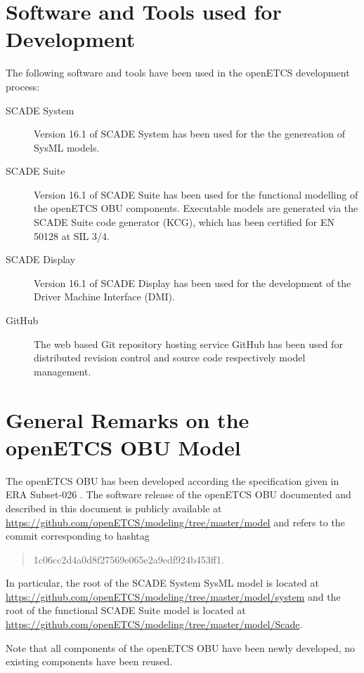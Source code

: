 \section{Software and Tools used for Development}

The following software and tools have been used in the openETCS development process:
\begin{description}
\item[SCADE System] Version 16.1 of SCADE System has been used for the the genereation of SysML models.
\item[SCADE Suite] Version 16.1 of SCADE Suite has been used for the functional modelling of the openETCS OBU components. Executable models are generated via the SCADE Suite code generator (KCG), which has been certified for EN 50128 at SIL 3/4.
\item[SCADE Display] Version 16.1 of SCADE Display has been used for the development of the Driver Machine Interface (DMI).
\item[GitHub] The web based Git repository hosting service GitHub has been used for distributed revision control and source code respectively model management.
\end{description}


\section{General Remarks on the openETCS OBU Model}
The openETCS OBU has been developed according the specification given in ERA Subset-026 \cite{subset-026}. The software release of the openETCS OBU documented and described in this document is publicly available at \url{https://github.com/openETCS/modeling/tree/master/model} and refers to the commit corresponding to hashtag 
\begin{quotation}
1c06cc2d4a0d8f27569e065e2a9edf924b453ff1.
\end{quotation}
In particular, the root of the SCADE System SysML model is located at
\url{https://github.com/openETCS/modeling/tree/master/model/system}
and the root of the functional SCADE Suite model is located at
\url{https://github.com/openETCS/modeling/tree/master/model/Scade}.

Note that all components of the openETCS OBU have been newly developed, no existing components have been reused.